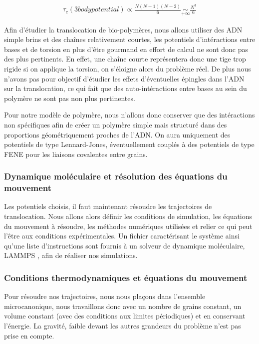 \documentclass[a4paper,11pt]{article}
\begin{document}
\begin{eqnarray}
\tau_c(3bodypotential) \propto \frac{N(N-1)(N-2)}{6} \underset{+\infty}{\sim} \frac{N^3}{6}
\label{3bodypot}
\end{eqnarray}



Afin d'étudier la translocation de bio-polymères, nous allons utiliser des ADN simple brins et des chaînes relativement courtes, les potentiels d'intéractions entre bases et de torsion en plus d'être gourmand en effort de calcul ne sont donc pas des plus pertinents. En effet, une chaîne courte représentera donc une tige trop rigide si on applique la torsion, on s'éloigne alors du problème réel. De plus nous n'avons pas pour objectif d'étudier les effets d'éventuelles épingles dans l'ADN sur la translocation, ce qui fait que des auto-intéractions entre bases au sein du polymère ne sont pas non plus pertinentes.

Pour notre modèle de polymère, nous n'allons donc conserver que des intéractions non spécifiques afin de créer un polymère simple mais structuré dans des proportions géométriquement proches de l'ADN. On aura uniquement des potentiels de type Lennard-Jones, éventuellement couplés à des potentiels de type FENE pour les liaisons covalentes entre grains.

\subsubsection{Dynamique moléculaire et résolution des équations du mouvement}

Les potentiels choisis, il faut maintenant résoudre les trajectoires de translocation. Nous allons alors définir les conditions de simulation, les équations du mouvement à résoudre, les méthodes numériques utilisées et relier ce qui peut l'être aux conditions expérimentales.
Un fichier caractérisant le système ainsi qu'une liste d'instructions sont fournis à un solveur de dynamique moléculaire, LAMMPS \cite{lammps}, afin de réaliser nos simulations.

\subsubsection*{Conditions thermodynamiques et équations du mouvement}



Pour résoudre nos trajectoires, nous nous plaçons dans l'ensemble microcanonique, nous travaillons donc avec un nombre de grains constant, un volume constant (avec des conditions aux limites périodiques) et en conservant l'énergie. La gravité, faible devant les autres grandeurs du problème n'est pas prise en compte.
\end{document}
